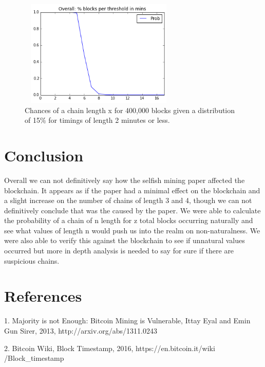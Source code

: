 \documentclass{sig-alternate-05-2015}
\begin{document}
\begin{figure}
\centering
\includegraphics[height=2in, width=3in]{probability.png}
\caption{ Chances of a chain length x for 400,000 blocks given a distribution of 15\% for timings of length 2 minutes or less.}
\end{figure} 

\section{Conclusion}
Overall we can not definitively say how the selfish mining paper affected the blockchain. It appears as if the paper had a minimal effect on the blockchain and a slight increase on the number of chains of length 3 and 4, though we can not definitively conclude that was the caused by the paper. We were able to calculate the probability of a chain of n length for z total blocks occurring naturally and see what values of length n would push us into the realm on non-naturalness. We were also able to verify this against the blockchain to see if unnatural values occurred but more in depth analysis is needed to say for sure if there are suspicious chains.   

\section{References}
1. Majority is not Enough: Bitcoin Mining is Vulnerable, Ittay Eyal and Emin Gun Sirer, 2013, http://arxiv.org/abs/1311.0243 

2. Bitcoin Wiki, Block Timestamp, 2016, https://en.bitcoin.it/wiki
/Block\_timestamp
\end{document}
